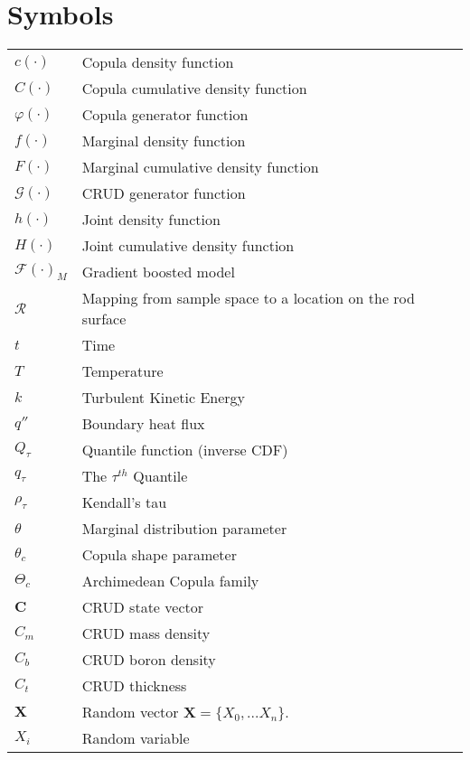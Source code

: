 \section*{Symbols}
\begin{tabular}{l l}
$c(\cdot)$ & Copula density function \\
$C(\cdot)$ & Copula cumulative density function \\
$\varphi(\cdot)$ & Copula generator function \\
$f(\cdot)$ & Marginal density function \\
$F(\cdot)$ & Marginal cumulative density function \\
$\mathcal G(\cdot)$ & CRUD generator function \\
$h(\cdot)$ & Joint density function \\
$H(\cdot)$ & Joint cumulative density function \\
$\mathcal F(\cdot)_M$ & Gradient boosted model \\
$\mathcal R$ & Mapping from sample space to a location on the rod surface \\
$t$ & Time \\
$T$ & Temperature \\
$k$ & Turbulent Kinetic Energy \\
$q''$ & Boundary heat flux \\
$Q_{\tau}$ & Quantile function (inverse CDF) \\
$q_{\tau}$ & The $\tau^{th}$ Quantile \\
$\rho_{\tau}$ & Kendall's tau \\
$\theta$ & Marginal distribution parameter \\
$\theta_c$ & Copula shape parameter \\
$\Theta_c$ & Archimedean Copula family \\
$\mathbf C$ & CRUD state vector \\
$C_m$ & CRUD mass density \\
$C_b$ & CRUD boron density \\
$C_t$ & CRUD thickness \\
$\mathbf X$ & Random vector $\mathbf X = \{X_0, ... X_n\}$. \\
$X_i$ & Random variable \\
\end{tabular}


\listoftables
{}

\listoffigures
{}

\pagebreak
